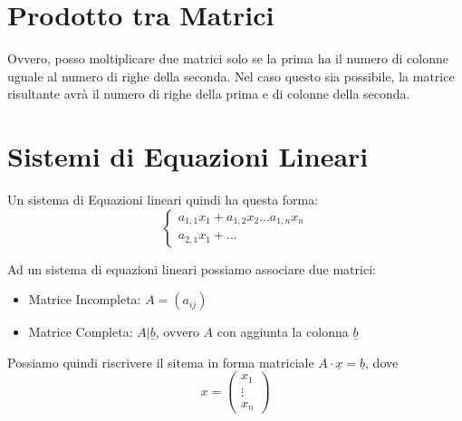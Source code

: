 \section{Prodotto tra Matrici}
Ovvero, posso moltiplicare due matrici solo se la prima ha il numero di colonne uguale al numero di righe della seconda.
Nel caso questo sia possibile, la matrice risultante avrà il numero di righe della prima e di colonne della seconda.


\section{Sistemi di Equazioni Lineari}
Un sistema di Equazioni lineari quindi ha questa forma:
\[
	\begin{cases}
		a_{1,1} x_1 + a_{1,2}x_2 ... a_{1,n} x_n \\
		a_{2,1} x_1 + ...
	\end{cases}
\]

Ad un sistema di equazioni lineari possiamo associare due matrici:
\begin{itemize}
	\item Matrice Incompleta: $A=(a_{ij})$
	\item Matrice Completa: $A|\underline{b}$, ovvero $A$ con aggiunta la colonna $\underline{b}$
\end{itemize}
Possiamo quindi riscrivere il sitema in forma matriciale $A \cdot \underline{x} = \underline{b}$, dove
\[x=\begin{pmatrix}x_1\\\vdots\\x_n\end{pmatrix}\]

